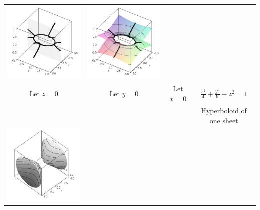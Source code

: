 \begin{center}
\begin{tabular}{cccc}
\includegraphics[width=\mywidth]{functions/quadric-3}&
\includegraphics[width=\mywidth]{functions/quadric-4}
\\
Let $z=0$ &
Let $y=0$ &
Let $x=0$ &
$\frac{x^2}{4}+\frac{y^2}{9}-z^2 =1$\\
&&&Hyperboloid of one sheet
\\
\includegraphics[width=\mywidth]{functions/quadric-5}&

\end{tabular}
\end{center}
